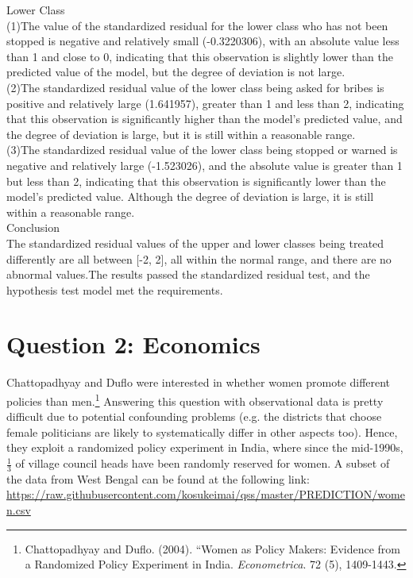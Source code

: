 \documentclass[12pt,letterpaper]{article}
\begin{document}
\begin{enumerate}
	Lower Class\\
	(1)The value of the standardized residual for the lower class who has not been stopped is negative and relatively small (-0.3220306), with an absolute value less than 1 and close to 0, indicating that this observation is slightly lower than the predicted value of the model, but the degree of deviation is not large.\\
	(2)The standardized residual value of the lower class being asked for bribes is positive and relatively large (1.641957), greater than 1 and less than 2, indicating that this observation is significantly higher than the model's predicted value, and the degree of deviation is large, but it is still within a reasonable range.\\
	(3)The standardized residual value of the lower class being stopped or warned is negative and relatively large (-1.523026), and the absolute value is greater than 1 but less than 2, indicating that this observation is significantly lower than the model's predicted value. Although the degree of deviation is large, it is still within a reasonable range.\\
	
	Conclusion\\
	The standardized residual values of the upper and lower classes being treated differently are all between [-2, 2], all within the normal range, and there are no abnormal values.The results passed the standardized residual test, and the hypothesis test model met the requirements.\\
\end{enumerate}
\newpage

\section*{Question 2: Economics}
Chattopadhyay and Duflo were interested in whether women promote different policies than men.\footnote{Chattopadhyay and Duflo. (2004). ``Women as Policy Makers: Evidence from a Randomized Policy Experiment in India. \textit{Econometrica}. 72 (5), 1409-1443.} Answering this question with observational data is pretty difficult due to potential confounding problems (e.g. the districts that choose female politicians are likely to systematically differ in other aspects too). Hence, they exploit a randomized policy experiment in India, where since the mid-1990s, $\frac{1}{3}$ of village council heads have been randomly reserved for women. A subset of the data from West Bengal can be found at the following link: \url{https://raw.githubusercontent.com/kosukeimai/qss/master/PREDICTION/women.csv}\\
\end{document}
